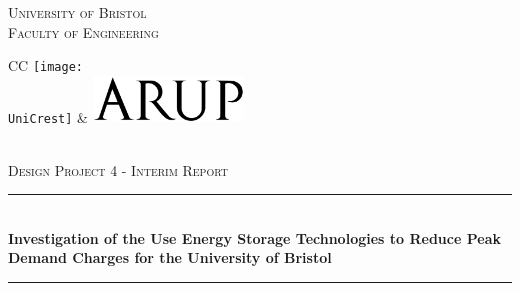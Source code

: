 \documentclass[10pt]{article}
\newcommand{\AssignmentTitle}{Investigation of the Use Energy Storage Technologies to Reduce Peak Demand Charges for the University of Bristol}
\newcommand{\ModuleTitle}{Design Project 4 - Interim Report}
\newcommand{\University}{University of Bristol}
\newcommand{\Faculty}{Faculty of Engineering}
\newcommand{\UniCrest}{crestbris.png}
\newcommand{\horrule}[1]{\rule{\linewidth}{#1}}
\begin{document}
  \setlength{\abovedisplayskip}{-18pt}
  \setlength{\belowdisplayskip}{0pt}
  \setlength{\abovedisplayshortskip}{-18pt}
  \setlength{\belowdisplayshortskip}{0pt}



\begin{titlepage}

	\center %
		\normalfont \normalsize \textsc{\University} \\ [10pt]
		\normalfont \normalsize \textsc{\Faculty} \\ [25pt]
\begin{tabular}{CC}
  \texttt{[image: \\UniCrest]} &   \includegraphics[width=0.3\textwidth]{Arup_logo.png}
\end{tabular}\\[0.5cm]
		\normalfont \normalsize \textsc{\ModuleTitle} \\ [25pt]
		\horrule{0.5pt} \\[0.4cm]
		\huge \textbf{\AssignmentTitle} \\
		\horrule{2pt} \\[0.5cm]

\end{titlepage}
\end{document}
